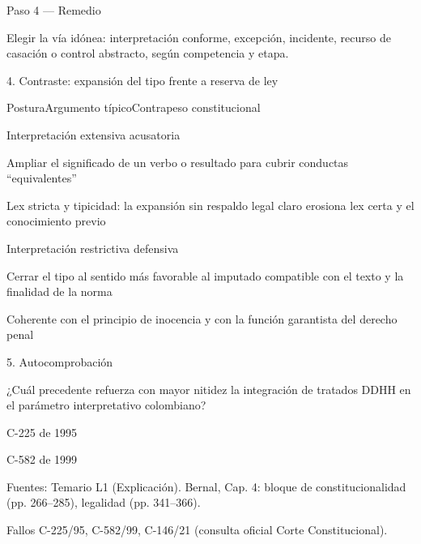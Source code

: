 \documentclass[11pt,a4paper]{article}
\begin{document}
          Paso 4 — Remedio\par
          Elegir la vía idónea: interpretación conforme, excepción, incidente, recurso de casación o control abstracto, según competencia y etapa.\par








      4. Contraste: expansión del tipo frente a reserva de ley\par



          PosturaArgumento típicoContrapeso constitucional\par





            Interpretación extensiva acusatoria\par
            Ampliar el significado de un verbo o resultado para cubrir conductas “equivalentes”\par
            Lex stricta y tipicidad: la expansión sin respaldo legal claro erosiona lex certa y el conocimiento previo\par



            Interpretación restrictiva defensiva\par
            Cerrar el tipo al sentido más favorable al imputado compatible con el texto y la finalidad de la norma\par
            Coherente con el principio de inocencia y con la función garantista del derecho penal\par









      5. Autocomprobación\par

      ¿Cuál precedente refuerza con mayor nitidez la integración de tratados DDHH en el parámetro interpretativo colombiano?\par

      C-225 de 1995\par
      C-582 de 1999\par





      Fuentes: Temario L1 (Explicación). Bernal, Cap. 4: bloque de constitucionalidad (pp. 266–285), legalidad (pp. 341–366).\par
      Fallos C-225/95, C-582/99, C-146/21 (consulta oficial Corte Constitucional).\par
\end{document}
